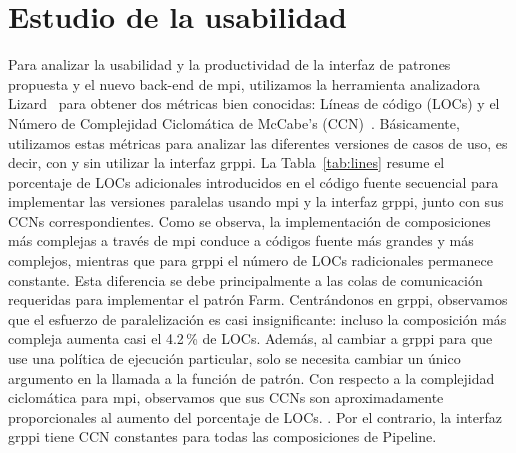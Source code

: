 \section{Estudio de la usabilidad}
\label{sec:estudio_usabilidad}

Para analizar la usabilidad y la productividad de la interfaz de patrones propuesta y el nuevo back-end de \acrshort{mpi}, utilizamos la herramienta analizadora Lizard~\cite{lizard} para obtener dos métricas bien conocidas: Líneas de código (LOCs) y el Número de Complejidad Ciclomática de McCabe's (CCN)~\cite{McCabe:1976}. Básicamente, utilizamos estas métricas para analizar las diferentes versiones de casos de uso, es decir, con y sin utilizar la interfaz \acrshort{grppi}. La Tabla~\ref{tab:lines} resume el porcentaje de LOCs adicionales introducidos en el código fuente secuencial para implementar las versiones paralelas usando \acrshort{mpi} y la interfaz \acrshort{grppi}, junto con sus CCNs correspondientes. Como se observa, la implementación de composiciones más complejas a través de \acrshort{mpi} conduce a códigos fuente más grandes y más complejos, mientras que para \acrshort{grppi} el número de LOCs radicionales permanece constante. Esta diferencia se debe principalmente a las colas de comunicación requeridas para implementar el patrón Farm. Centrándonos en \acrshort{grppi}, observamos que el esfuerzo de paralelización es casi insignificante: incluso la composición más compleja aumenta casi el 4.2\,\% de LOCs. Además, al cambiar a \acrshort{grppi} para que use una política de ejecución particular, solo se necesita cambiar un único argumento en la llamada a la función de patrón. Con respecto a la complejidad ciclomática para \acrshort{mpi}, observamos que sus CCNs son aproximadamente proporcionales al aumento del porcentaje de LOCs. . Por el contrario, la interfaz \acrshort{grppi} tiene CCN constantes para todas las composiciones de Pipeline.

